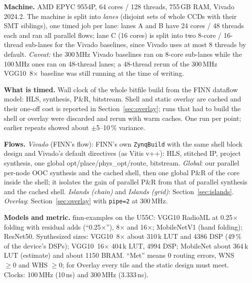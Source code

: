 \documentclass[10pt,twocolumn]{article}
\newcommand{\code}[1]{\texttt{\small #1}}
\begin{document}
\textbf{Machine.} AMD EPYC 9554P, 64 cores / 128 threads, 755\,GB RAM, Vivado 2024.2. The
machine is split into \emph{lanes} (disjoint sets of whole CCDs with their SMT siblings), one
timed job per lane: lanes A and B have 24 cores / 48 threads each and ran all parallel flows;
lane C (16 cores) is split into two 8-core / 16-thread sub-lanes for the Vivado baselines,
since Vivado uses at most 8 threads by default. \emph{Caveat:} the 300\,MHz Vivado baselines ran
on 8-core sub-lanes while the 100\,MHz ones ran on 48-thread lanes; a 48-thread rerun of the
300\,MHz VGG10~8$\times$ baseline was still running at the time of writing.

\textbf{What is timed.} Wall clock of the whole bitfile build from the FINN dataflow model: HLS,
synthesis, P\&R, bitstream. Shell and static overlay are cached and their one-off cost is
reported in Section~\ref{sec:overlay}; runs that had to build the shell or overlay were discarded
and rerun with warm caches. One run per point; earlier repeats showed about $\pm$5--10\,\%
variance.

\textbf{Flows.} \emph{Vivado} (FINN's flow): FINN's own \code{ZynqBuild} with the same shell
block design and Vivado's default directives (as Vitis v++): HLS, stitched IP, project synthesis,
one global opt/place/phys\_opt/route, bitstream. \emph{Global}: our parallel per-node OOC
synthesis and the cached shell, then one global P\&R of the core inside the shell; it isolates
the gain of parallel P\&R from that of parallel synthesis and the cached shell. \emph{Islands
(chain)} and \emph{Islands (grid)}: Section~\ref{sec:islands}. \emph{Overlay}: Section~\ref{sec:overlay}
with \code{pipe=2} at 300\,MHz.

\textbf{Models and metric.} finn-examples on the U55C: VGG10 RadioML at 0.25$\times$ folding
with residual adds (``0.25$\times$''), 8$\times$ and 16$\times$; MobileNetV1 (hand folding);
ResNet50. Synthesized sizes: VGG10~8$\times$ about 310\,k LUT and 4386 DSP (49\,\% of the
device's DSPs); VGG10~16$\times$ 404\,k LUT, 4994 DSP; MobileNet about 364\,k LUT (estimate) and
about 1150 BRAM. ``Met'' means 0 routing errors, WNS $\ge 0$ and WHS $\ge 0$; for Overlay
every tile and the static design must meet. Clocks: 100\,MHz (10\,ns) and 300\,MHz (3.333\,ns).
\end{document}
